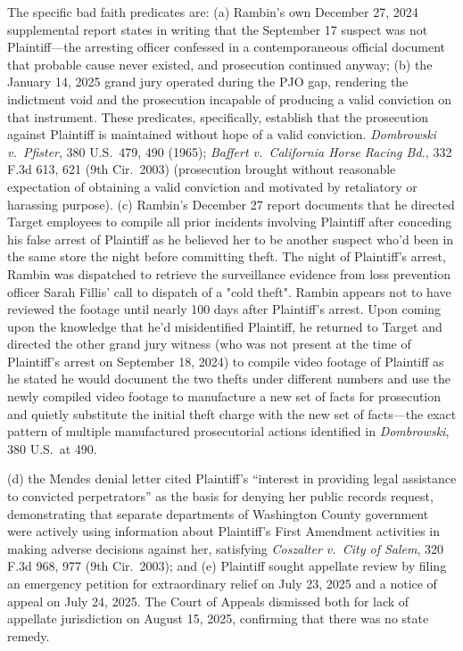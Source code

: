 \documentclass[12pt,letterpaper]{article}
\newenvironment{subparas}{%
	\begin{enumerate}[label=\alph*.,leftmargin=0.75in,itemsep=0pt,%
		parsep=0pt,topsep=4pt]%
	}{%
	\end{enumerate}%
}
\begin{document}
\begin{subparas}
		The specific bad faith predicates are: 
		(a) Rambin's own December 27,
		2024 supplemental report states in writing that the September 17
		suspect was not Plaintiff---the arresting officer confessed in a
		contemporaneous official document that probable cause never existed,
		and prosecution continued anyway; 
		(b) the January 14, 2025 grand jury
		operated during the PJO gap, rendering the indictment void and the
		prosecution incapable of producing a valid conviction on that
		instrument. These predicates, specifically, establish that the prosecution against Plaintiff is maintained without hope of a valid conviction. \textit{Dombrowski v.\ Pfister}, 380 U.S.\ 479, 490 (1965); \textit{Baffert v.\ California Horse Racing Bd.}, 332 F.3d 613, 621 (9th Cir.\ 2003) (prosecution brought without reasonable expectation of obtaining a valid conviction and motivated by retaliatory or harassing purpose). 
		(c) Rambin's December 27 report documents that he directed Target employees to compile all prior incidents involving Plaintiff after conceding his false arrest of Plaintiff as he believed her to be another suspect who'd been in the same store the night before committing theft. The night of Plaintiff's arrest, Rambin was dispatched to retrieve the surveillance evidence from loss prevention officer Sarah Fillis' call to dispatch of a "cold theft". Rambin appears not to have reviewed the footage until nearly 100 days after Plaintiff's arrest. Upon coming upon the knowledge that he'd misidentified Plaintiff, he returned to Target and directed the other grand jury witness (who was not present at the time of Plaintiff's arrest on September 18, 2024) to compile video footage of Plaintiff as he stated he would document the two thefts under different numbers and use the newly compiled video footage to manufacture a new set of facts for prosecution and quietly substitute the initial theft charge with the new set of facts---the exact pattern of multiple manufactured prosecutorial actions identified in \textit{Dombrowski}, 380 U.S.\ at 490.  
		
		(d) the Mendes denial letter cited Plaintiff's
		``interest in providing legal assistance to convicted perpetrators'' as the basis for denying her public records request, demonstrating
		that separate departments of Washington County government were actively using information about Plaintiff's	First Amendment activities in making adverse decisions against her,
		satisfying \textit{Coszalter v.\ City of Salem}, 320 F.3d 968, 977
		(9th Cir.\ 2003); and 
		(e) Plaintiff sought appellate review by filing an emergency petition for extraordinary relief on July 23, 2025 and a notice of appeal on July 24, 2025. The Court of Appeals dismissed both for lack of appellate jurisdiction on August 15, 2025, confirming that there was no state remedy.
		
	\end{subparas}
\end{document}
